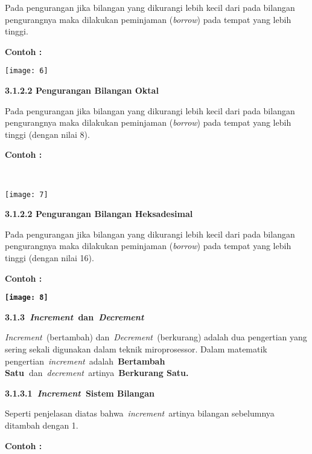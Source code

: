 \documentclass[11pt,fleqn]{book} %
\begin{document}
\begin{myEnumerate}
\begin{itemize}
Pada pengurangan jika bilangan yang dikurangi lebih kecil dari pada bilangan pengurangnya maka dilakukan peminjaman (\textit{borrow}) pada tempat yang lebih tinggi.

\noindent \textbf{Contoh :}

\begin{center}
\noindent \texttt{[image: 6]}
\end{center}

\noindent 

\noindent \textbf{3.1.2.2 Pengurangan Bilangan Oktal}

Pada pengurangan jika bilangan yang dikurangi lebih kecil dari pada bilangan pengurangnya maka dilakukan peminjaman (\textit{borrow}) pada tempat yang lebih tinggi (dengan nilai 8).

\noindent \textbf{Contoh :}

\noindent \textbf{~}

\begin{center} 
\texttt{[image: 7]} 
\end{center}

\textbf{3.1.2.2 Pengurangan Bilangan Heksadesimal}

Pada pengurangan jika bilangan yang dikurangi lebih kecil dari pada bilangan pengurangnya maka dilakukan peminjaman (\textit{borrow}) pada tempat yang lebih tinggi (dengan nilai 16).

\noindent \textbf{Contoh :}

\begin{center}
\noindent \textbf{\texttt{[image: 8]}}
\end{center}

\noindent 

\noindent \textbf{3.1.3~\textit{Increment~}dan~\textit{Decrement}}

\textit{Increment~}(bertambah) dan~\textit{Decrement~}(berkurang) adalah dua pengertian yang sering sekali digunakan dalam teknik miroprosessor. Dalam matematik pengertian~\textit{increment}~adalah~\textbf{Bertambah Satu~}dan~\textit{decrement~}artinya~\textbf{Berkurang Satu.}

\noindent \textbf{3.1.3.1~\textit{Increment~}Sistem Bilangan}

Seperti penjelasan diatas bahwa~\textit{increment}~artinya bilangan sebelumnya ditambah dengan 1.

\noindent \textbf{Contoh :}


\end{itemize}
\end{myEnumerate}
\end{document}
